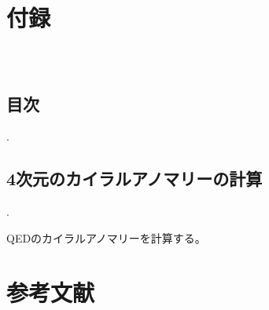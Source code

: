 \documentclass[
  unicode,a4paper,10pt,
  xcolor = {dvipsnames,svgnames},
  hyperref ={colorlinks=true,citecolor=Navy,linkcolor=NavyBlue,urlcolor=purple},
  ja=standard,lualatex
]{beamer}
\begin{document}
\renewcommand{\thefigure}{\thesubsection.\arabic{figure}}

\renewcommand{\thetable}{\thesubsection.\arabic{table}}
\makeatother

\section{付録}

\begin{frame}[plain]
  \frametitle{\ }
  \huge \secname
\end{frame}

\subsection{目次}

\begin{frame}[plain]{\thesubsection. \subsecname}
  \tableofcontents
\end{frame}


\subsection{4次元のカイラルアノマリーの計算}


\begin{frame}{\thesubsection. \subsecname}

  QEDのカイラルアノマリーを計算する。
  

\end{frame}


\section{参考文献}
\begin{frame}{\secname}

  \scriptsize
  \beamertemplatetextbibitems
  
  

  \nocite{Fujikawa:2001a}
  \nocite{Fujikawa:2001b}
  \nocite{Choi:2020dws}

\end{frame}

\setcounter{framenumber}{\value{Appendix}}
\end{document}
